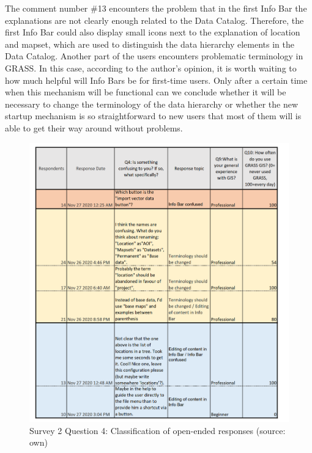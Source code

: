 \documentclass[a4paper,10pt,twoside]{article}
\begin{document}
\noindent The comment number \#13 encounters the problem that in the first Info Bar the explanations are not clearly enough related to the Data Catalog. Therefore, the first Info Bar could also display small icons next to the explanation of location and mapset, which are used to distinguish the data hierarchy elements in the Data Catalog. Another part of the users encounters problematic terminology in GRASS. In this case, according to the author's opinion, it is worth waiting to how much helpful will Info Bars be for first-time users. Only after a certain time when this mechanism will be functional can we conclude whether it will be necessary to change the terminology of the data hierarchy or whether the new startup mechanism is so straightforward to new users that most of them will is able to get their way around without problems.

\vspace{0.3cm}
\begin{figure}[hbt!] 
\begin{center}
\includegraphics[width=16cm]{../surveys/analyzed_data/survey2_question4.png} 
\caption[Survey 2 Question 4: Classification of open-ended responses]{Survey 2 Question 4: Classification of open-ended responses (source: own)}
\label{fig:survey2_question4}
\end{center}
\end{figure}
\end{document}
